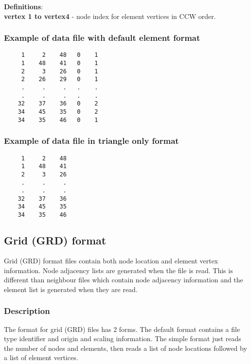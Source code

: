 \documentclass{article}
\begin{document}
\noindent\textbf{Definitions}:\\ 

\noindent
\textbf{vertex 1 to vertex4} - node index for element vertices in CCW order. \\


\subsubsection{Example of data file with default element format}
\begin{small}
\begin{lstlisting}
     1     2    48   0    1
     1    48    41   0    1
     2     3    26   0    1
     2    26    29   0    1
     .     .     .   .    .
     .     .     .   .    .
    32    37    36   0    2
    34    45    35   0    2
    34    35    46   0    1
\end{lstlisting}
\end{small}

\subsubsection{Example of data file in triangle only format}
\begin{small}
\begin{lstlisting}
     1     2    48
     1    48    41
     2     3    26
     .     .     .
     .     .     .
    32    37    36
    34    45    35
    34    35    46
\end{lstlisting}
\end{small}

\newpage
\subsection[Grid (GRD) format]{Grid (GRD) format}

Grid (GRD) format files contain both node location and element vertex information. Node adjacency lists are
generated when the file is read. This is different than neighbour files which contain node adjacency
information and the element list is generated when they are read.

\subsubsection[Description]{Description}

The format for grid (GRD) files has 2 forms. The default format contains a file type identifier and origin and
scaling information. The simple format just reads the number of nodes and elements, then reads a list of
node locations followed by a list of element vertices.\\
\end{document}
